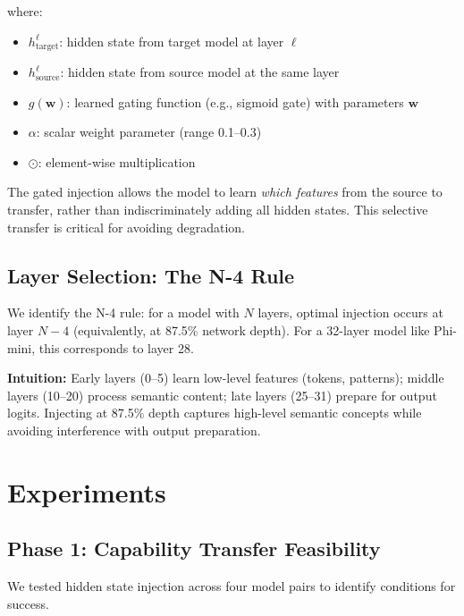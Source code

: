 \documentclass[11pt,a4paper]{article}
\begin{document}
where:
\begin{itemize}
    \item $h_{\text{target}}^{\ell}$: hidden state from target model at layer $\ell$
    \item $h_{\text{source}}^{\ell}$: hidden state from source model at the same layer
    \item $g(\mathbf{w})$: learned gating function (e.g., sigmoid gate) with parameters $\mathbf{w}$
    \item $\alpha$: scalar weight parameter (range 0.1--0.3)
    \item $\odot$: element-wise multiplication
\end{itemize}

The gated injection allows the model to learn \emph{which features} from the source to transfer, rather than indiscriminately adding all hidden states. This selective transfer is critical for avoiding degradation.

\subsection{Layer Selection: The N-4 Rule}

We identify the N-4 rule: for a model with $N$ layers, optimal injection occurs at layer $N-4$ (equivalently, at 87.5\% network depth). For a 32-layer model like Phi-mini, this corresponds to layer 28.

\textbf{Intuition:} Early layers (0--5) learn low-level features (tokens, patterns); middle layers (10--20) process semantic content; late layers (25--31) prepare for output logits. Injecting at 87.5\% depth captures high-level semantic concepts while avoiding interference with output preparation.

\section{Experiments}

\subsection{Phase 1: Capability Transfer Feasibility}

We tested hidden state injection across four model pairs to identify conditions for success.
\end{document}

